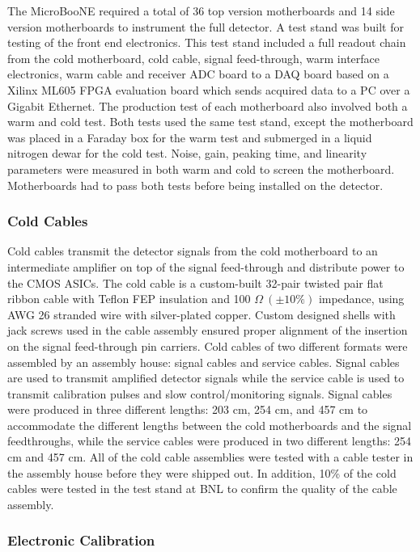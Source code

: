 The MicroBooNE \lartpc required a total of 36 top version motherboards and 14 side version motherboards to instrument the full detector. A test stand was built for testing of the front end electronics. This test stand included a full readout chain from the cold motherboard, cold cable, signal feed-through, warm interface electronics, warm cable and receiver ADC board to a DAQ board based on a Xilinx ML605 FPGA evaluation board which sends acquired data to a PC over a Gigabit Ethernet. The production test of each motherboard also involved both a warm and cold test. Both tests used the same test stand, except the motherboard was placed in a Faraday box for the warm test and submerged in a liquid nitrogen dewar for the cold test. Noise, gain, peaking time, and linearity parameters were measured in both warm and cold to screen the motherboard. Motherboards had to pass both tests  before being installed on the detector.

\subsubsection{Cold Cables}

Cold cables transmit the detector signals from the cold motherboard to an intermediate amplifier on top of the signal feed-through and distribute power to the CMOS ASICs. The cold cable is a custom-built 32-pair twisted pair flat ribbon cable with Teflon FEP insulation and 100 $\Omega~(\pm10\%)$ impedance, using AWG 26 stranded wire with silver-plated copper. Custom designed shells with jack screws used in the cable assembly ensured proper alignment of the insertion on the signal feed-through pin carriers.  Cold cables of two different formats were assembled by an assembly house: signal cables and service cables. Signal cables are used to transmit amplified detector signals while the service cable is used to transmit calibration pulses and slow control/monitoring signals. Signal cables were produced in three different lengths: 203 cm, 254 cm, and 457 cm to accommodate the different lengths between the cold motherboards and the signal feedthroughs, while the service cables were produced in two different lengths: 254 cm and 457 cm. All of the cold cable assemblies were tested with a cable tester in the assembly house before they were shipped out. In addition, 10\% of the cold cables were tested in the test stand at BNL to confirm the quality of the cable assembly. 

\subsubsection{Electronic Calibration}

